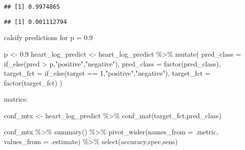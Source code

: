 \documentclass[
]{article}
\newenvironment{Shaded}{\begin{snugshade}}{\end{snugshade}}
\newcommand{\AttributeTok}[1]{\textcolor[rgb]{0.77,0.63,0.00}{#1}}
\newcommand{\DecValTok}[1]{\textcolor[rgb]{0.00,0.00,0.81}{#1}}
\newcommand{\FloatTok}[1]{\textcolor[rgb]{0.00,0.00,0.81}{#1}}
\newcommand{\FunctionTok}[1]{\textcolor[rgb]{0.00,0.00,0.00}{#1}}
\newcommand{\NormalTok}[1]{#1}
\newcommand{\OtherTok}[1]{\textcolor[rgb]{0.56,0.35,0.01}{#1}}
\newcommand{\SpecialCharTok}[1]{\textcolor[rgb]{0.00,0.00,0.00}{#1}}
\newcommand{\StringTok}[1]{\textcolor[rgb]{0.31,0.60,0.02}{#1}}
\begin{document}
\begin{verbatim}
## [1] 0.9974865
\end{verbatim}

\begin{Shaded}
\end{Shaded}

\begin{verbatim}
## [1] 0.001112794
\end{verbatim}

calsify predictions for p = 0.9

\begin{Shaded}
\begin{Highlighting}[]
\NormalTok{p }\OtherTok{\textless{}{-}} \FloatTok{0.9}
\NormalTok{heart\_log\_predict }\OtherTok{\textless{}{-}}\NormalTok{ heart\_log\_predict }\SpecialCharTok{\%\textgreater{}\%}
  \FunctionTok{mutate}\NormalTok{(}
    \AttributeTok{pred\_class =} \FunctionTok{if\_else}\NormalTok{(pred }\SpecialCharTok{\textgreater{}}\NormalTok{ p,}\StringTok{"positive"}\NormalTok{,}\StringTok{"negative"}\NormalTok{),}
    \AttributeTok{pred\_class =} \FunctionTok{factor}\NormalTok{(pred\_class),}
    \AttributeTok{target\_fct =} \FunctionTok{if\_else}\NormalTok{(target }\SpecialCharTok{==} \DecValTok{1}\NormalTok{,}\StringTok{"positive"}\NormalTok{,}\StringTok{"negative"}\NormalTok{),}
    \AttributeTok{target\_fct =} \FunctionTok{factor}\NormalTok{(target\_fct)}
\NormalTok{) }
\end{Highlighting}
\end{Shaded}

matrics:

\begin{Shaded}
\begin{Highlighting}[]
\NormalTok{conf\_mtx }\OtherTok{\textless{}{-}}\NormalTok{ heart\_log\_predict  }\SpecialCharTok{\%\textgreater{}\%}
  \FunctionTok{conf\_mat}\NormalTok{(target\_fct,pred\_class)}

\NormalTok{conf\_mtx }\SpecialCharTok{\%\textgreater{}\%} \FunctionTok{summary}\NormalTok{() }\SpecialCharTok{\%\textgreater{}\%} 
  \FunctionTok{pivot\_wider}\NormalTok{(}\AttributeTok{names\_from =}\NormalTok{ .metric, }\AttributeTok{values\_from =}\NormalTok{ .estimate) }\SpecialCharTok{\%\textgreater{}\%} 
  \FunctionTok{select}\NormalTok{(accuracy,spec,sens)}
\end{Highlighting}
\end{Shaded}
\end{document}
